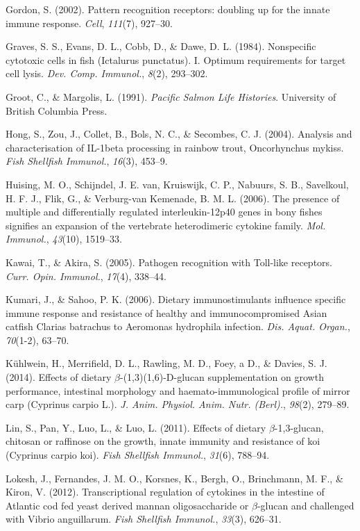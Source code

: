 \documentclass[12pt,a4paper,]{article}
\begin{document}
Gordon, S. (2002). Pattern recognition receptors: doubling up for the
innate immune response. \emph{Cell}, \emph{111}(7), 927--30.

Graves, S. S., Evans, D. L., Cobb, D., \& Dawe, D. L. (1984).
Nonspecific cytotoxic cells in fish (Ictalurus punctatus). I. Optimum
requirements for target cell lysis. \emph{Dev. Comp. Immunol.},
\emph{8}(2), 293--302.

Groot, C., \& Margolis, L. (1991). \emph{Pacific Salmon Life Histories}.
University of British Columbia Press.

Hong, S., Zou, J., Collet, B., Bols, N. C., \& Secombes, C. J. (2004).
Analysis and characterisation of IL-1beta processing in rainbow trout,
Oncorhynchus mykiss. \emph{Fish Shellfish Immunol.}, \emph{16}(3),
453--9.

Huising, M. O., Schijndel, J. E. van, Kruiswijk, C. P., Nabuurs, S. B.,
Savelkoul, H. F. J., Flik, G., \& {Verburg-van Kemenade}, B. M. L.
(2006). The presence of multiple and differentially regulated
interleukin-12p40 genes in bony fishes signifies an expansion of the
vertebrate heterodimeric cytokine family. \emph{Mol. Immunol.},
\emph{43}(10), 1519--33.

Kawai, T., \& Akira, S. (2005). Pathogen recognition with Toll-like
receptors. \emph{Curr. Opin. Immunol.}, \emph{17}(4), 338--44.

Kumari, J., \& Sahoo, P. K. (2006). Dietary immunostimulants influence
specific immune response and resistance of healthy and immunocompromised
Asian catfish Clarias batrachus to Aeromonas hydrophila infection.
\emph{Dis. Aquat. Organ.}, \emph{70}(1-2), 63--70.

Kühlwein, H., Merrifield, D. L., Rawling, M. D., Foey, a D., \& Davies,
S. J. (2014). Effects of dietary $\beta$-(1,3)(1,6)-D-glucan
supplementation on growth performance, intestinal morphology and
haemato-immunological profile of mirror carp (Cyprinus carpio L.).
\emph{J. Anim. Physiol. Anim. Nutr. (Berl).}, \emph{98}(2), 279--89.

Lin, S., Pan, Y., Luo, L., \& Luo, L. (2011). Effects of dietary
$\beta$-1,3-glucan, chitosan or raffinose on the growth, innate immunity
and resistance of koi (Cyprinus carpio koi). \emph{Fish Shellfish
Immunol.}, \emph{31}(6), 788--94.

Lokesh, J., Fernandes, J. M. O., Korsnes, K., Bergh, O., Brinchmann, M.
F., \& Kiron, V. (2012). Transcriptional regulation of cytokines in the
intestine of Atlantic cod fed yeast derived mannan oligosaccharide or
$\beta$-glucan and challenged with Vibrio anguillarum. \emph{Fish
Shellfish Immunol.}, \emph{33}(3), 626--31.
\end{document}

